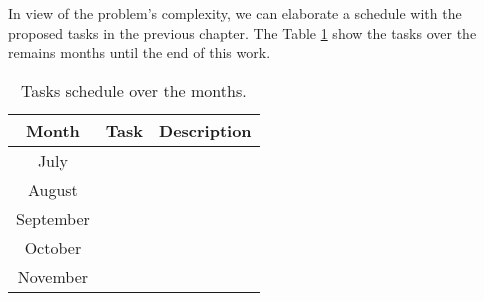 In view of the problem's complexity, we can elaborate a schedule with the proposed tasks in the previous chapter. The Table \ref{tab:roadmap-table} show the tasks over the remains months until the end of this work.

\begin{table}[h!]
	\centering
	\caption{Tasks schedule over the months.}
	\label{tab:roadmap-table}
	\begin{tabular}{c||cc}
		\hline\hline
		\textbf{Month} & \textbf{Task} & \textbf{Description} \\ \hline\hline
		     July      &               &                      \\
		    August     &               &                      \\
		  September    &               &                      \\
		   October     &               &                      \\
		   November    &               &                      \\ \hline\hline
	\end{tabular}
\end{table}